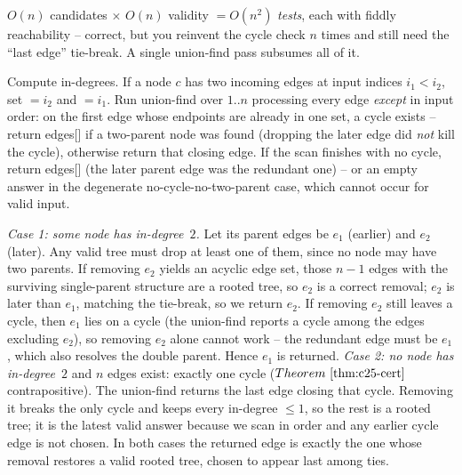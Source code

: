 \begin{thinkbox}
{$O(n)$ candidates $\times$ $O(n)$ validity $=O(n^{2})$ \emph{tests}, each with fiddly
reachability -- correct, but you reinvent the cycle check $n$ times and still need the
``last edge'' tie-break. A single union-find pass subsumes all of it.}
\end{thinkbox}

Compute in-degrees. If a node $c$ has two incoming edges at input indices $i_1<i_2$, set
$=i_2$ and $=i_1$. Run union-find over $1..n$ processing every edge
\emph{except}  in input order: on the first edge whose endpoints are already in one set,
a cycle exists -- return edges[] if a two-parent node was found (dropping the later edge
did \emph{not} kill the cycle), otherwise return that closing edge. If the scan finishes with no
cycle, return edges[] (the later parent edge was the redundant one) -- or an empty
answer in the degenerate no-cycle-no-two-parent case, which cannot occur for valid input.

\begin{proofbox}
\emph{Case 1: some node has in-degree~$2$.} Let its parent edges be $e_1$ (earlier) and $e_2$ (later).
Any valid tree must drop at least one of them, since no node may have two parents.
If removing $e_2$ yields an acyclic edge set, those $n-1$ edges with the surviving single-parent
structure are a rooted tree, so $e_2$ is a correct removal; $e_2$ is later than $e_1$, matching the
tie-break, so we return $e_2$.
If removing $e_2$ still leaves a cycle, then $e_1$ lies on a cycle (the union-find reports a cycle
among the edges excluding $e_2$), so removing $e_2$ alone cannot work -- the redundant edge must be
$e_1$, which also resolves the double parent. Hence $e_1$ is returned.
\emph{Case 2: no node has in-degree~$2$} and $n$ edges exist: exactly one cycle ($\thmref{c25-cert}$
contrapositive). The union-find returns the last edge closing that cycle. Removing it breaks the only
cycle and keeps every in-degree $\le1$, so the rest is a rooted tree; it is the latest valid answer
because we scan in order and any earlier cycle edge is not chosen. In both cases the returned edge is
exactly the one whose removal restores a valid rooted tree, chosen to appear last among ties.
\end{proofbox}

